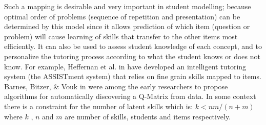 Such a mapping is desirable and very important in student modelling; because optimal order of problems (sequence of repetition and presentation) can be determined by this model since it allows prediction of which item (question or problem) will cause learning of skills that transfer to the other items most efficiently. It can also be used to assess student knowledge of each concept, and to personalize the tutoring process according to what the student knows or does not know.  For example, Heffernan et al. in \citep{feng2009using} have developed an intelligent tutoring system (the ASSISTment system) that relies on fine grain skills mapped to items.  Barnes, Bitzer, \& Vouk in \citep{barnes2005experimental} were among the early researchers to propose algorithms for automatically discovering a Q-Matrix from data. In some context there is a constraint for the number of latent skills which is: $k<nm/(n+m)$ \protect\citep{lee1999learning} where $k$ , $n$ and $m$ are number of skills, students and items respectively.
  

